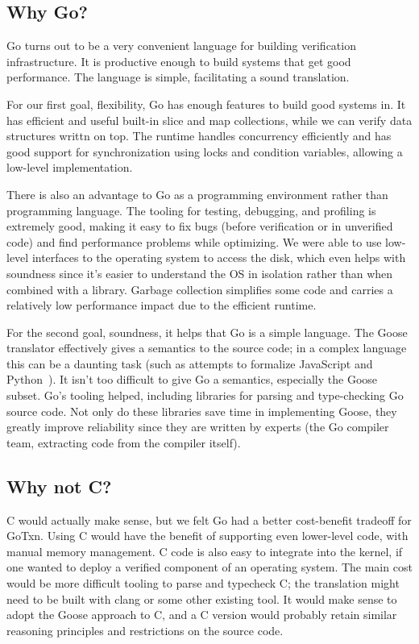 \subsection{Why Go?}

Go turns out to be a very convenient language for building verification
infrastructure. It is productive enough to build systems that get good
performance. The language is simple, facilitating a sound translation.

For our first goal, flexibility, Go has enough features to build good systems
in. It has efficient and useful built-in slice and map collections, while we can
verify data structures writtn on top. The runtime handles concurrency
efficiently and has good support for synchronization using locks and condition
variables, allowing a low-level implementation.

There is also an advantage to Go as a programming environment rather than
programming language. The tooling for testing, debugging, and profiling is
extremely good, making it easy to fix bugs (before verification or in unverified
code) and find performance problems while optimizing. We were able to use
low-level interfaces to the operating system to access the disk, which even
helps with soundness since it's easier to understand the OS in isolation rather
than when combined with a library. Garbage collection simplifies some code and
carries a relatively low performance impact due to the efficient runtime.

For the second goal, soundness, it helps that Go is a simple language. The Goose
translator effectively gives a semantics to the source code; in a complex
language this can be a daunting task (such as attempts to formalize JavaScript and
Python~\cite{guha:lambda-js,politz:python-semantics}). It isn't too
difficult to give Go a semantics, especially the Goose subset. Go's tooling
helped, including libraries for parsing and type-checking Go source code. Not
only do these libraries save time in implementing Goose, they greatly improve
reliability since they are written by experts (the Go compiler team, extracting
code from the compiler itself).

\subsection{Why not C?}

C would actually make sense, but we felt Go had a better cost-benefit tradeoff
for GoTxn. Using C would have the benefit of supporting even lower-level code,
with manual memory management. C code is also easy to integrate into the kernel,
if one wanted to deploy a verified component of an operating system. The main
cost would be more difficult tooling to parse and typecheck C; the translation
might need to be built with clang or some other existing tool. It would make
sense to adopt the Goose approach to C, and a C version would probably retain
similar reasoning principles and restrictions on the source code.

